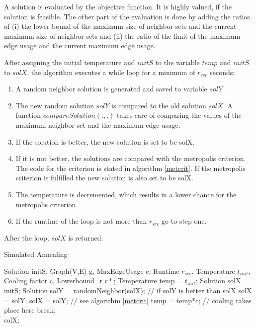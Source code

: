 \documentclass [12pt]{article}
\begin{document}
\noindent
A solution is evaluated by the objective function. It is highly valued, if the solution is
feasible. The other part of the evaluation is done by adding the ratios of (i) the lower bound of the maximum size of neighbor sets and the current maximum size of neighbor sets and
(ii) the ratio of the limit of the maximum edge usage and the current maximum edge usage.
\medskip

\noindent
After assigning the initial temperature and $initS$ to the variable $temp$ and $initS$ to $solX$,
the algorithm executes a while loop for a minimum of $r_{sec}$ seconds:
\begin{enumerate}
  \item {A random neighbor solution is generated and saved to variable $solY$}
  \item {The new random solution $solY$ is compared to the old solution $solX$. A function $compareSolution(.,.)$ takes care of 
    comparing the values of the maximum neighbor set and the maximum edge usage.}
  \item {If the solution is better, the new solution is set to be solX.}
  \item {If it is not better, the solutions are compared with the metropolis criterion. The code for the criterion is stated in algorithm \ref{metcrit}. If the metropolis criterion
    is fulfilled the new solution is also set to be solX. }
  \item {The temperature is decremented, which results in a lower chance for the metropolis criterion.}
  \item {If the runtime of the loop is not more than $r_{sec}$ go to step one.}
\end{enumerate}
After the loop, $solX$ is returned.


\begin {algorithm} [H]
\caption {Simulated Annealing}
\label {simA}
\begin {algorithmic} [3]
\Require Solution initS, Graph(V,E) g, MaxEdgeUsage c, Runtime $r_{sec}$, Temperature $t_{init}$, Cooling factor c,
Lowerbound\_r $r*$; 
\State Temperature temp = $t_{init}$;
\State Solution solX = initS; 
\State Solution solY = randomNeighbor(solX);
 // if solY is better than solX
\State solX = solY;
\Else
{}
\State solX = solY; // see algorithm \ref{metcrit}
\EndIf
\EndIf    
\State temp = temp*c; // cooling takes place here
\State break;
\EndIf 
\EndWhile\\
\Return solX;
\end {algorithmic}
\end {algorithm}
\end{document}
